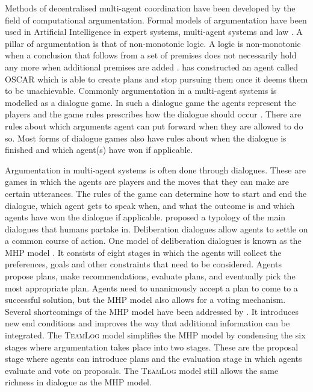 Methods of decentralised multi-agent coordination have been developed by the 
field of
computational argumentation. Formal models of argumentation have been used in
Artificial Intelligence in expert systems, multi-agent systems and law
\citep{vaneemeren2014}. A pillar of argumentation is that of non-monotonic 
logic. A logic is non-monotonic when a conclusion that follows from a set of 
premises does not necessarily hold any more when additional premises are 
added \citep{modgil2013,vaneemeren2014}. \cite{pollock1995} has constructed an 
agent called OSCAR which is 
able to create plans and stop pursuing them once it deems them to be 
unachievable. Commonly argumentation in a multi-agent systems is
modelled as a dialogue game. In such a dialogue game the agents represent the
players and the game rules prescribes how the dialogue should occur
\citep{walton1995}. There are rules about which arguments agent can put forward
when they are allowed to do so. Most forms of dialogue games also have rules
about when the dialogue is finished and which agent(s) have won if applicable.

Argumentation in multi-agent systems is often done through dialogues. These are 
games in which the agents are players and the moves that they can make are 
certain utterances. The rules of the game can determine how to start 
and end the dialogue, which agent gets to speak when, and what the outcome is 
and which agents have won the dialogue if applicable. \cite{walton1995} 
proposed a typology of the main dialogues that humans partake in. Deliberation 
dialogues allow agents to settle on a common course of action. One model of 
deliberation dialogues is known as the MHP model \cite{mcburney2007}. It 
consists of eight stages in which the agents will collect the preferences, 
goals and other constraints that need to be considered. Agents propose plans, 
make recommendations, evaluate plans, and eventually pick the most appropriate 
plan. Agents need to unanimously accept a plan to come to a successful 
solution, but the MHP model also allows for a voting mechanism. Several 
shortcomings of the MHP model have been addressed by \cite{walton2014}. It 
introduces new end conditions and improves the way that additional information 
can be integrated. The \textsc{TeamLog} model \cite{dunin-keplicz2011} 
simplifies the MHP model by condensing the six stages where argumentation takes 
place into two stages. These are the proposal stage where agents can introduce 
plans and the evaluation stage in which agents evaluate and vote on proposals. 
The \textsc{TeamLog} model still allows the same richness in dialogue as the 
MHP model.

